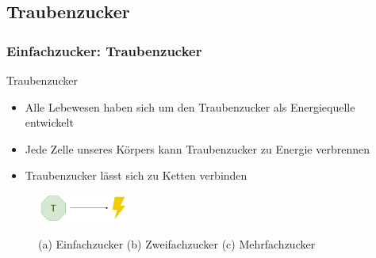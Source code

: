 \documentclass[xcolor=dvipsnames]{beamer}
\begin{document}
    \subsection{Traubenzucker}
    \begin{frame}[allowframebreaks]
        \frametitle{Einfachzucker: Traubenzucker}

        \begin{block}{Traubenzucker}
            \begin{itemize}
                \setlength\itemsep{1em}
                \item Alle Lebewesen haben sich um den Traubenzucker als Energiequelle entwickelt
                \item Jede Zelle unseres Körpers kann Traubenzucker zu Energie verbrennen
                \item Traubenzucker lässt sich zu Ketten verbinden
            \end{itemize}
        \end{block}

        \begin{figure}
            \centering
            \includegraphics[width=3cm]{../images/t_energie.png}
        \end{figure}

        \framebreak

        \begin{figure}
            \centering
            \caption{(a) Einfachzucker (b) Zweifachzucker (c) Mehrfachzucker}
        \end{figure}

        \framebreak


\end{frame}
\end{document}
